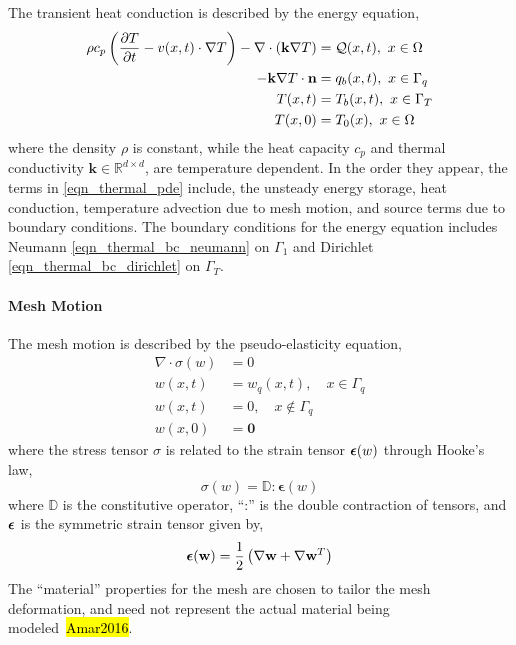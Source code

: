 The transient heat conduction is described by the energy equation,
\begin{subequations}
    \begin{align}
        \rho c_p\left(\ppt{T} - v(x,t)\cdot\nabla T\right) - \nabla\cdot (\mathbf{k}\nabla T) &= \cQ(x,t),\ x\in\Omega \label{eqn_thermal_pde}\\
        -\mathbf{k}\nabla T\cdot \vn &= q_b(x,t),\ x\in\Gamma_q\label{eqn_thermal_bc_neumann}\\
        T(x,t) &= T_b(x,t),\ x\in\Gamma_T\label{eqn_thermal_bc_dirichlet}\\
        T(x,0) &= T_0(x),\ x\in\Omega\label{eqn_thermal_ic}
    \end{align}\label{eqn_governing_equations}
\end{subequations}
where the density $\rho$ is constant, while the heat capacity $c_p$ and thermal conductivity $\mathbf{k}\in\mathbb{R}^{d\times d}$, are temperature dependent. In the order they appear, the terms in \cref{eqn_thermal_pde} include, the unsteady energy storage, heat conduction, temperature advection due to mesh motion, and source terms due to boundary conditions. The boundary conditions for the energy equation includes Neumann \cref{eqn_thermal_bc_neumann} on $\Gamma_1$ and Dirichlet \cref{eqn_thermal_bc_dirichlet} on $\Gamma_T$.

\paragraph*{Mesh Motion} The mesh motion is described by the pseudo-elasticity equation,
\begin{subequations}
    \begin{align}
        \nabla\cdot\sigma(w) &= 0\label{eqn_elasticity_pde}\\
        w(x,t) &= w_q(x,t),\quad x\in\Gamma_q\label{eqn_displacement_heated_bc}\\
        w(x,t) &= 0,\quad x\notin \Gamma_q\label{eqn_displacement_unheated_bc}\\
        w(x,0) &= \boldsymbol{0}\label{eqn_displacement_initial_condition}
    \end{align}
\end{subequations}
where the stress tensor $\sigma$ is related to the strain tensor $\boldsymbol{\epsilon}(w)$ through Hooke's law,
\[
    \sigma(w) = \mathbb{D}:\boldsymbol{\epsilon}(w)
\]
where $\mathbb{D}$ is the constitutive operator, ``:'' is the double contraction of tensors, and $\boldsymbol{\epsilon}$ is the symmetric strain tensor given by,
\[
    \boldsymbol{\epsilon}(\mathbf{w}) = \frac{1}{2}\left(\nabla\mathbf{w} + \nabla\mathbf{w}^T\right)
\]
The ``material'' properties for the mesh are chosen to tailor the mesh deformation, and need not represent the actual material being modeled~\hl{Amar2016}. 

